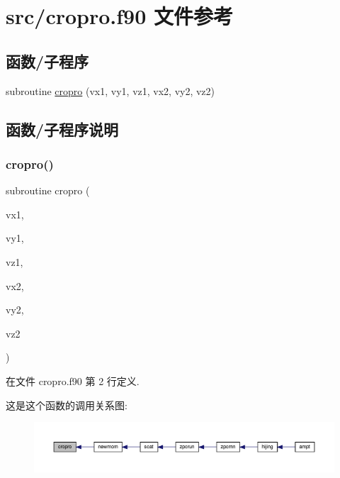 \hypertarget{cropro_8f90}{}\section{src/cropro.f90 文件参考}
\label{cropro_8f90}
\subsection*{函数/子程序}
\begin{DoxyCompactItemize}
\item 
subroutine \mbox{\hyperlink{cropro_8f90_adea2bad79a9e589b214402b5a401336e}{cropro}} (vx1, vy1, vz1, vx2, vy2, vz2)
\end{DoxyCompactItemize}


\subsection{函数/子程序说明}
\mbox{\label{cropro_8f90_adea2bad79a9e589b214402b5a401336e}} 
\subsubsection{\texorpdfstring{cropro()}{cropro()}}
{\footnotesize\ttfamily subroutine cropro (\begin{DoxyParamCaption}\item[{}]{vx1,  }\item[{}]{vy1,  }\item[{}]{vz1,  }\item[{}]{vx2,  }\item[{}]{vy2,  }\item[{}]{vz2 }\end{DoxyParamCaption})}



在文件 cropro.\+f90 第 2 行定义.

这是这个函数的调用关系图\+:
\nopagebreak
\begin{figure}[H]
\begin{center}
\leavevmode
\includegraphics[width=350pt]{cropro_8f90_adea2bad79a9e589b214402b5a401336e_icgraph}
\end{center}
\end{figure}
